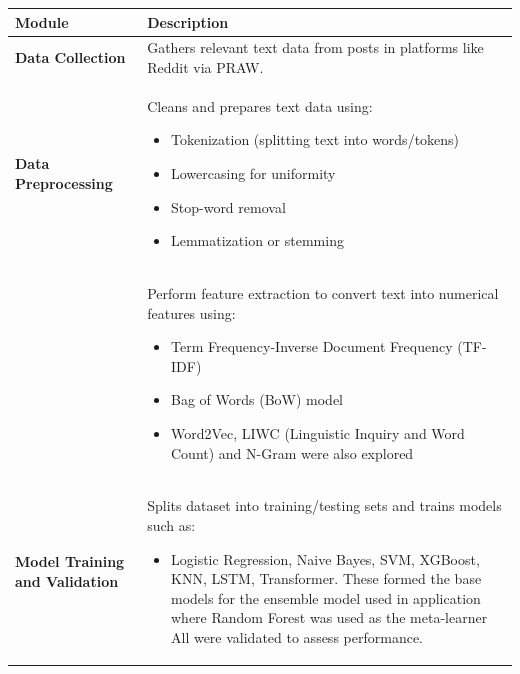 \begin{table}[H]
    \centering
    \renewcommand{\arraystretch}{1.2} %
    \small %
    \begin{tabularx}{\textwidth}{|p{3.5cm}|X|}
        \hline
        \textbf{Module} & \textbf{Description} \\
        \hline
        \textbf{Data Collection} & Gathers relevant text data from posts in platforms like Reddit via PRAW. \\
        \hline
        \textbf{Data Preprocessing} & Cleans and prepares text data using:
        \begin{itemize}
            \setlength{\itemsep}{0pt}  %
            \setlength{\parskip}{0pt}
            \item Tokenization (splitting text into words/tokens)
            \item Lowercasing for uniformity
            \item Stop-word removal
            \item Lemmatization or stemming
        \end{itemize} \\
        \textbf{} & Perform feature extraction to convert text into numerical features using:
        \begin{itemize}
            \setlength{\itemsep}{0pt}  %
            \setlength{\parskip}{0pt}
            \item Term Frequency-Inverse Document Frequency (TF-IDF)
            \item Bag of Words (BoW) model
            \item Word2Vec, LIWC (Linguistic Inquiry and Word Count) and N-Gram were also explored
        \end{itemize} \\
        \hline
        \textbf{Model Training and Validation} & Splits dataset into training/testing sets and trains models such as:
        \setlength{\itemsep}{0pt}  %
        \setlength{\parskip}{0pt}
        \begin{itemize}
            \item Logistic Regression, Naive Bayes, SVM, XGBoost, KNN, LSTM, Transformer. These formed the base models for the ensemble model used in application where Random Forest was used as the meta-learner All were validated to assess performance.
        \end{itemize} \\

\end{tabularx}
\end{table}
